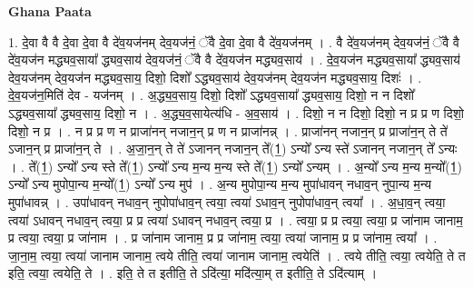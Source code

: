 \documentclass[17pt]{extarticle}
\begin{document}
\textbf{Ghana Paata } \newline

1. दे॒वा वै वै दे॒वा दे॒वा वै दे॑व॒यज॑नम् देव॒यज॑नं॒ ॅवै दे॒वा दे॒वा वै दे॑व॒यज॑नम् । . वै दे॑व॒यज॑नम् देव॒यज॑नं॒ ॅवै वै दे॑व॒यज॑न मद्ध्यव॒साया᳚ द्ध्यव॒साय॑ देव॒यज॑नं॒ ॅवै वै दे॑व॒यज॑न मद्ध्यव॒साय॑ । . दे॒व॒यज॑न मद्ध्यव॒साया᳚ द्ध्यव॒साय॑ देव॒यज॑नम् देव॒यज॑न मद्ध्यव॒साय॒ दिशो॒ दिशो᳚ ऽद्ध्यव॒साय॑ देव॒यज॑नम् देव॒यज॑न मद्ध्यव॒साय॒ दिशः॑ । . दे॒व॒यज॑न॒मिति॑ देव - यज॑नम् । . अ॒द्ध्य॒व॒साय॒ दिशो॒ दिशो᳚ ऽद्ध्यव॒साया᳚ द्ध्यव॒साय॒ दिशो॒ न न दिशो᳚ ऽद्ध्यव॒साया᳚ द्ध्यव॒साय॒ दिशो॒ न । . अ॒द्ध्य॒व॒सायेत्य॑धि - अ॒व॒साय॑ । . दिशो॒ न न दिशो॒ दिशो॒ न प्र प्र ण दिशो॒ दिशो॒ न प्र । . न प्र प्र ण न प्राजा॑नन् नजान॒न् प्र ण न प्राजा॑नन्न् । . प्राजा॑नन् नजान॒न् प्र प्राजा॑न॒न् ते ते॑ ऽजान॒न् प्र प्राजा॑न॒न् ते । . अ॒जा॒न॒न् ते ते॑ ऽजानन् नजान॒न् ते᳚(1॒) ऽन्यो᳚ ऽन्य स्ते॑ ऽजानन् नजान॒न् ते᳚ ऽन्यः । . ते᳚(1॒) ऽन्यो᳚ ऽन्य स्ते ते᳚(1॒) ऽन्यो᳚ ऽन्य म॒न्य म॒न्य स्ते ते᳚(1॒) ऽन्यो᳚ ऽन्यम् । . अ॒न्यो᳚ ऽन्य म॒न्य म॒न्यो᳚(1॒) ऽन्यो᳚ ऽन्य मुपोपा॒न्य म॒न्यो᳚(1॒) ऽन्यो᳚ ऽन्य मुप॑ । . अ॒न्य मुपोपा॒न्य म॒न्य मुपा॑धावन् नधाव॒न् नुपा॒न्य म॒न्य मुपा॑धावन्न् । . उपा॑धावन् नधाव॒न् नुपोपा॑धाव॒न् त्वया॒ त्वया॑ ऽधाव॒न् नुपोपा॑धाव॒न् त्वया᳚ । . अ॒धा॒व॒न् त्वया॒ त्वया॑ ऽधावन् नधाव॒न् त्वया॒ प्र प्र त्वया॑ ऽधावन् नधाव॒न् त्वया॒ प्र । . त्वया॒ प्र प्र त्वया॒ त्वया॒ प्र जा॑नाम जानाम॒ प्र त्वया॒ त्वया॒ प्र जा॑नाम । . प्र जा॑नाम जानाम॒ प्र प्र जा॑नाम॒ त्वया॒ त्वया॑ जानाम॒ प्र प्र जा॑नाम॒ त्वया᳚ । . जा॒ना॒म॒ त्वया॒ त्वया॑ जानाम जानाम॒ त्वये तीति॒ त्वया॑ जानाम जानाम॒ त्वयेति॑ । . त्वये तीति॒ त्वया॒ त्वयेति॒ ते त इति॒ त्वया॒ त्वयेति॒ ते । . इति॒ ते त इतीति॒ ते ऽदि॑त्या॒ मदि॑त्या॒म् त इतीति॒ ते ऽदि॑त्याम् । \newline
\end{document}

